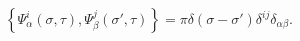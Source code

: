 \begin{equation}
\left\{\Psi_{\alpha}^{i}(\sigma, \tau), \Psi_{\beta}^{j}(\sigma',
\tau)\right\}=\pi\delta(\sigma-\sigma')\delta^{ij}\delta_{\alpha\beta}.
\end{equation}

